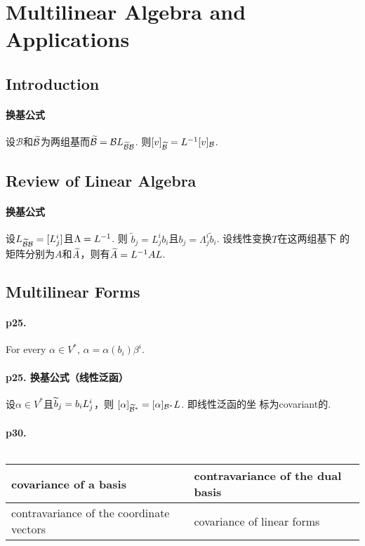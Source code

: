 \section{Multilinear Algebra and Applications}

\subsection{Introduction}
  \paragraph{换基公式}
    设$\mathcal{B}$和$\widetilde{\mathcal{B}}$为两组基而$\widetilde{\mathcal{B}}=
    \mathcal{B}L_{\widetilde{\mathcal{B}}\mathcal{B}}$. 则$[v]_{\widetilde{
    \mathcal{B}}}=L^{-1}[v]_{\mathcal{B}}$.

\subsection{Review of Linear Algebra}
  \paragraph{换基公式}
    设$L_{\widetilde{\mathcal{B}}\mathcal{B}}=[L^i_j]$且$\Lambda=L^{-1}$. 则
    $\tilde{b}_j=L^i_jb_i$且$b_j=\Lambda_j^i\tilde{b}_i$. 设线性变换$T$在这两组基下
    的矩阵分别为$A$和$\widetilde{A}$，则有$\widetilde{A}=L^{-1} AL$. 

\subsection{Multilinear Forms}
  \paragraph{p25. }
    For every $\alpha\in V^*$, $\alpha=\alpha(b_i)\beta^i$.

  \paragraph{p25. 换基公式（线性泛函）}
    设$\alpha\in V^*$且$\widetilde{b}_j = b_iL^i_j$，则
    $[\alpha]_{\widetilde{\mathcal{B}}^*}=[\alpha]_{\mathcal{B}^*}L$. 即线性泛函的坐
    标为covariant的.

  \paragraph{p30.}
    $\,$\\
    \begin{tabular}{|l|l|}
      \hline
      covariance of a basis                    
      & contravariance of the dual basis  \\ \hline
      contravariance of the coordinate vectors 
      & covariance of linear forms \\ \hline
    \end{tabular}
  
